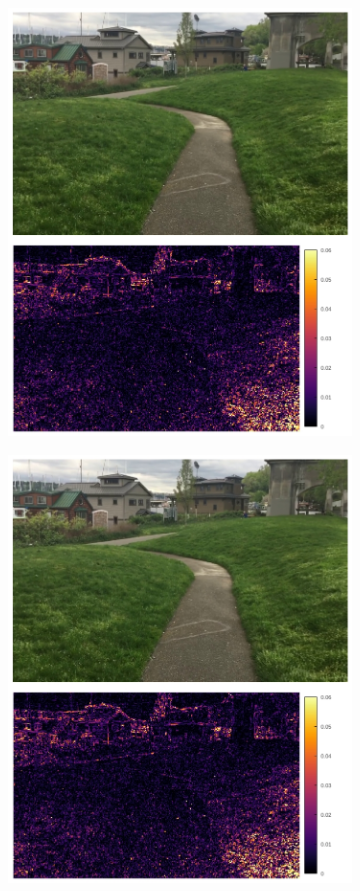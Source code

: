 \documentclass{article}
\begin{document}
\begin{figure}[h]
\begin{subfigure}{0.14\textwidth}
    \includegraphics[width=1\linewidth]{qua_imgs/720p_240fps_1_abme.jpg}
\end{subfigure}%
\begin{subfigure}{0.14\textwidth}
	\centering
    \includegraphics[width=1\linewidth]{qua_imgs/720p_240fps_1_film.jpg}

\end{subfigure}
\end{figure}
\end{document}
